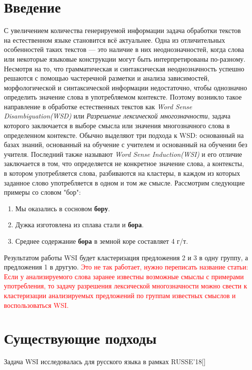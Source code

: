 \documentclass[11pt]{article}
\begin{document}
    \begin{multicols}{2}
        \section*{Введение}\label{sec:intro}
        С увеличением количества генерируемой информации задача обработки текстов на естественном языке становится всё
        актуальнее.
        Одна из отличительных особенностей таких текстов — это наличие в них неоднозначностей, когда слова
        или некоторые языковые конструкции могут быть интерпретированы по-разному.
        Несмотря на то, что грамматическая и синтаксическая неоднозначность успешно решаются с помощью
        частеречной разметки и анализа зависимостей, морфологической и синтаксической информации недостаточно, чтобы
        однозначно определить значение слова в употребляемом контексте.
        Поэтому возникло такое направление в обработке естественных текстов как \textit{Word Sense Disambiguation(WSD)}
        или \textit{Разрешение лексической многозначности}, задача которого заключается в выборе смысла или значения
        многозначного слова в определенном контексте.
        Обычно выделяют три подхода к WSD: основанный на базах знаний, основанный на обучение с учителем и
        основанный на обучении без учителя.
        Последний также называют \textit{Word Sense Induction(WSI)} и его отличие
        заключается в том, что определяется не конкретное значение слова, а контексты, в котором употребляется слова,
        разбиваются на кластеры, в каждом из которых заданное слово употребляется в одном и том же смысле.
        Рассмотрим следующие примеры со словом "бор":
        \begin{enumerate}
        \item Мы оказались в сосновом \textbf{бору}.
        \item Дужка изготовлена из сплава стали и \textbf{бора}.
        \item Среднее содержание \textbf{бора} в земной коре составляет 4 г/т.
        \end{enumerate}
        Результатом работы WSI будет кластеризация предложения 2 и 3 в одну группу, а предложения 1 в другую.
        \textcolor{red}{ Это не так работает, нужно переписать название статьи:
        Если у анализируемого слова заранее известны возможные смыслы с примерами употребления,
        то задачу разрешения лексической многозначности можно свести к кластеризации анализируемых предложений по
        группам известных смыслов и воспользоваться WSI.}
        \section*{Существующие подходы}\label{sec:related_works}
        Задача WSI исследовалась для русского языка в рамках RUSSE'18[]

    \end{multicols}
\end{document}
